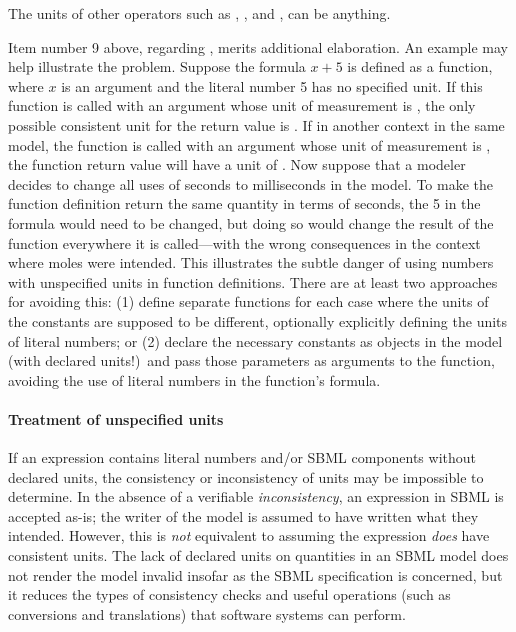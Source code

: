 The units of other operators such as , ,
and , can be anything.

Item number 9 above, regarding \FunctionDefinition, merits
additional elaboration.  An example may help illustrate the
problem.  Suppose the formula $x + 5$ is defined as a function,
where $x$ is an argument and the literal number 5 has no specified
unit.  If this function is called with an argument whose unit of
measurement is , the only possible consistent unit for
the return value is .  If in another context in the
same model, the function is called with an argument whose unit of
measurement is , the function return value will have
a unit of .  Now suppose that a modeler decides to
change all uses of seconds to milliseconds in the model.  To make
the function definition return the same quantity in terms of
seconds, the 5 in the formula would need to be changed, but doing
so would change the result of the function everywhere it is
called---with the wrong consequences in the context where moles
were intended.  This illustrates the subtle danger of using
numbers with unspecified units in function definitions.  There are
at least two approaches for avoiding this: (1) define separate
functions for each case where the units of the constants are
supposed to be different, optionally explicitly defining the units
of literal numbers; or (2) declare the necessary constants as
\Parameter objects in the model (with declared units!)\ and pass
those parameters as arguments to the function, avoiding the use of
literal numbers in the function's formula.


\paragraph{Treatment of unspecified units}

If an expression contains literal numbers and/or SBML components
without declared units, the consistency or inconsistency of units
may be impossible to determine.  In the absence of a verifiable
\emph{inconsistency}, an expression in SBML is accepted as-is; the
writer of the model is assumed to have written what they intended.
However, this is \emph{not} equivalent to assuming the expression
\emph{does} have consistent units.  The lack of declared units on
quantities in an SBML model does not render the model invalid
insofar as the SBML specification is concerned, but it reduces the
types of consistency checks and useful operations (such as
conversions and translations) that software systems can perform.

